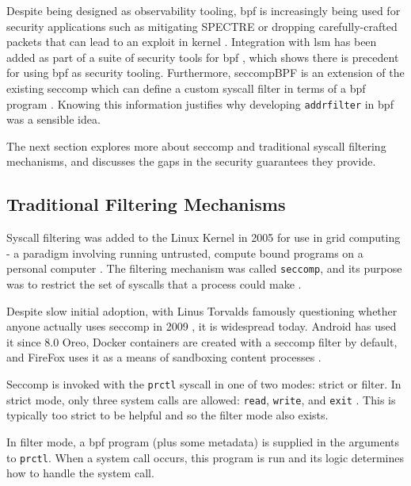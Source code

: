 Despite being designed as observability tooling, \ac{bpf} is increasingly being
used for security applications such as mitigating SPECTRE
\cite{SPECTRE_BPF_MITIGATION} or dropping carefully-crafted packets that can
lead to an exploit in kernel \cite{BPF_PACKET_MITIGATION}. Integration with
\ac{lsm} has been added as part of a suite of security tools for \ac{bpf}
\cite{StarovoitovBPFSecurity}, which
shows there is precedent for using \ac{bpf} as security tooling. Furthermore,
seccompBPF is an extension of the existing seccomp which can define a custom
syscall filter in terms of a \ac{bpf} program \cite{seccompBPF}. Knowing this information
justifies why developing \texttt{addrfilter} in \ac{bpf} was a sensible idea.

The next section explores more about seccomp and traditional syscall
filtering mechanisms, and discusses the gaps in the security guarantees they
provide.

\subsection{Traditional Filtering Mechanisms}

Syscall filtering was added to the Linux Kernel in 2005 for use in grid
computing - a paradigm involving running untrusted, compute bound programs on a
personal computer \cite{GRID_COMPUTING_INTRO}. The
filtering mechanism was called \texttt{seccomp}, and its purpose was to
restrict the set of syscalls that a process could make \cite{arcangeli_seccomp_2005}.

Despite slow initial adoption, with Linus Torvalds famously questioning whether
anyone actually uses seccomp in 2009 \cite{TORVALDS_ANYONE_USES_SECCOMP}, it is
widespread today. Android has used it since 8.0 Oreo, Docker containers are
created with a seccomp filter by default, and FireFox uses it as a means of
sandboxing content processes \cite{android_seccomp_oreo, docker_seccomp,
firefox_seccomp}.

Seccomp is invoked with the \texttt{prctl} syscall in one of two modes: strict
or filter. In strict mode, only three system calls are allowed: \texttt{read},
\texttt{write}, and \texttt{exit} \cite{MAN_PAGES_SECCOMP}. This is typically
too strict to be helpful and so the filter mode also exists.

In filter mode, a \ac{bpf} program (plus some metadata) is supplied in the arguments to
\texttt{prctl}. When a system call occurs, this program is run and its logic
determines how to handle the system call. 

